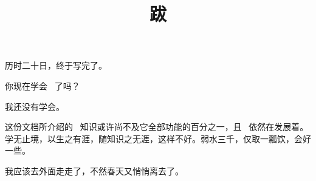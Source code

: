 \title{跋}

历时二十日，终于写完了。

你现在学会 \CONTEXT\ 了吗？

我还没有学会。

这份文档所介绍的 \CONTEXT\ 知识或许尚不及它全部功能的百分之一，且 \CONTEXT\ 依然在发展着。学无止境，以生之有涯，随知识之无涯，这样不好。弱水三千，仅取一瓢饮，会好一些。

我应该去外面走走了，不然春天又悄悄离去了。


